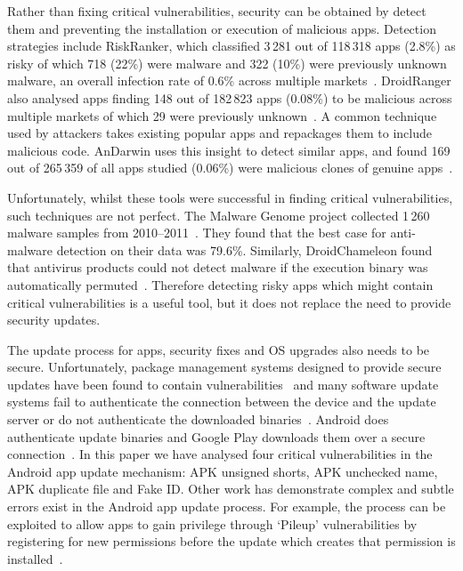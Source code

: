 \documentclass[conference,a4paper,twoside]{IEEEtran}
\begin{document}
Rather than fixing critical vulnerabilities, security can be obtained by detect them and preventing the installation or execution of malicious apps.
Detection strategies include RiskRanker, which classified 3\,281 out of 118\,318 apps (2.8\%) as risky of which 718 (22\%) were malware and 322 (10\%) were previously unknown malware, an overall infection rate of 0.6\% across multiple markets~\cite{Grace2012a}.
DroidRanger also analysed apps finding 148 out of 182\,823 apps (0.08\%) to be malicious across multiple markets of which 29 were previously unknown~\cite{Zhou2012a}.
A common technique used by attackers takes existing popular apps and repackages them to include malicious code. 
AnDarwin uses this insight to detect similar apps, and found 169 out of 265\,359 of all apps studied (0.06\%) were malicious clones of genuine apps~\cite{Crussell2013}.

Unfortunately, whilst these tools were successful in finding critical vulnerabilities, such techniques are not perfect.
The Malware Genome project collected 1\,260 malware samples from 2010--2011~\cite{Zhou2012b}.
They found that the best case for anti-malware detection on their data was 79.6\%.
Similarly, DroidChameleon found that antivirus products could not detect malware if the execution binary was automatically permuted~\cite{Rastogi2013}.
Therefore detecting risky apps which might contain critical vulnerabilities is a useful tool, but it does not replace the need to provide security updates.


The update process for apps, security fixes and OS upgrades also needs to be secure.
Unfortunately, package management systems designed to provide secure updates have been found to contain vulnerabilities~\cite{Cappos2008} and many software update systems fail to authenticate the connection between the device and the update server or do not authenticate the downloaded binaries~\cite{Bellissimo2006}.
Android does authenticate update binaries and Google Play downloads them over a secure connection~\cite{Viennot2014}.
In this paper we have analysed four critical vulnerabilities in the Android app update mechanism: APK unsigned shorts, APK unchecked name, APK duplicate file and Fake ID.
Other work has demonstrate complex and subtle errors exist in the Android app update process.
For example, the process can be exploited to allow apps to gain privilege through `Pileup' vulnerabilities by registering for new permissions before the update which creates that permission is installed~\cite{Xing2014}.
\end{document}
